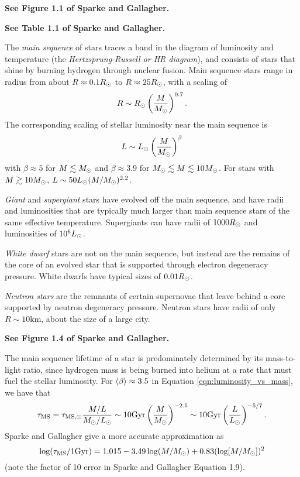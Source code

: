 \documentclass[12pt]{article}
\begin{document}
{\bf See Figure 1.1 of Sparke and Gallagher.}

{\bf See Table 1.1 of Sparke and Gallagher.}

The {\it main sequence} of stars traces a band in the diagram of luminosity and
temperature (the {\it Hertzsprung-Russell or HR diagram}), and consists of stars that
shine by burning hydrogen through nuclear fusion. Main sequence stars range in
radius from about $R\approx0.1R_{\odot}$ to $R\approx25R_{\odot}$, with a scaling of
\begin{equation}
R\sim R_{\odot}\left(\frac{M}{M_{\odot}}\right)^{0.7}.
\end{equation}
\noindent
The corresponding scaling of stellar luminosity near the main sequence is
\begin{equation}
\label{eqn:luminosity_vs_mass}
L\sim L_{\odot}\left(\frac{M}{M_{\odot}}\right)^{\beta}
\end{equation}
\noindent
with $\beta\approx5$ for $M\lesssim M_{\odot}$ and 
$\beta\approx3.9$ for $M_{\odot}\lesssim M \lesssim 10M_{\odot}$. For stars
with $M\gtrsim10M_{\odot}$, $L\sim50L_{\odot}(M/M_{\odot})^{2.2}$.

{\it Giant} and {\it supergiant} stars have evolved off the main sequence, and
have radii and luminosities that are typically much larger than main sequence
stars of the same effective temperature. Supergiants can have radii of $1000R_{\odot}$
and luminosities of $10^{6}L_{\odot}$.

{\it White dwarf} stars are not on the main sequence, but instead are the
remains of the core of an evolved star that is supported through electron
degeneracy pressure. White dwarfs have typical sizes of $0.01R_{\odot}$.

{\it Neutron stars} are the remnants of certain supernovae that leave behind
a core supported by neutron degeneracy pressure. Neutron stars have radii 
of only $R\sim10\mathrm{km}$, about the size of a large city.

{\bf See Figure 1.4 of Sparke and Gallagher.}

The main sequence lifetime of a star is predominately determined by its
mass-to-light ratio, since hydrogen mass is being burned into helium at a 
rate that must fuel the stellar luminosity. For $\langle\beta\rangle \approx 3.5$ in
Equation \ref{eqn:luminosity_vs_mass}, we have that
\begin{equation}
\label{eqn:main_sequence_lifetime_basic}
\tau_{\mathrm{MS}} = \tau_{\mathrm{MS},\odot}\frac{M/L}{M_{\odot}/L_{\odot}} \sim 10\mathrm{Gyr}\left(\frac{M}{M_{\odot}}\right)^{-2.5}\sim 10\mathrm{Gyr}\left(\frac{L}{L_{\odot}}\right)^{-5/7}.
\end{equation}
Sparke and Gallagher give a more accurate approximation as
\begin{equation}
\label{eqn:main_sequence_lifetime}
\log(\tau_{\mathrm{MS}}/1\mathrm{Gyr}) = 1.015 - 3.49\log(M/M_{\odot}) +0.83(\log[M/M_{\odot}])^2
\end{equation}
\noindent
(note the factor of 10 error in Sparke and Gallagher Equation 1.9).
\end{document}
